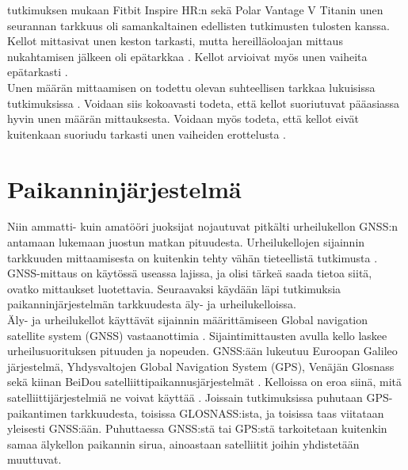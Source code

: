 \documentclass[utf8,bachelor,finnish]{bachelor}
\begin{document}
  \textcite{chinoy_performance_2022} tutkimuksen mukaan Fitbit Inspire HR:n sekä Polar Vantage V Titanin unen seurannan tarkkuus oli 
    samankaltainen edellisten tutkimusten tulosten kanssa. Kellot mittasivat unen keston tarkasti,
     mutta hereilläoloajan mittaus nukahtamisen jälkeen oli epätarkkaa \parencite{chinoy_performance_2022}.
      Kellot arvioivat myös unen vaiheita epätarkasti \parencite{chinoy_performance_2022}.\\
  
  Unen määrän mittaamisen on todettu olevan suhteellisen tarkkaa lukuisissa tutkimuksissa
   \parencite{de_zambotti_measures_2016,liang2018validity,chinoy_performance_2022,miller_validation_2022}. Voidaan siis kokoavasti todeta, että kellot suoriutuvat
    pääasiassa hyvin unen määrän mittauksesta. Voidaan myös todeta, että kellot eivät kuitenkaan suoriudu tarkasti unen vaiheiden erottelusta
     \parencite{chinoy_performance_2022,de_zambotti_measures_2016,liang2018validity}.
       
         
  \section{Paikanninjärjestelmä}
  Niin ammatti- kuin amatööri juoksijat nojautuvat pitkälti urheilukellon GNSS:n antamaan lukemaan juostun matkan pituudesta.
   Urheilukellojen sijainnin tarkkuuden mittaamisesta on kuitenkin tehty vähän tieteellistä tutkimusta \parencite{gilgen-ammann_accuracy_2020}.
    GNSS-mittaus on käytössä useassa lajissa, ja olisi tärkeä saada tietoa siitä, ovatko mittaukset luotettavia. Seuraavaksi käydään läpi tutkimuksia
     paikanninjärjestelmän tarkkuudesta äly- ja urheilukelloissa.\\

  Äly- ja urheilukellot käyttävät sijainnin määrittämiseen Global navigation satellite system (GNSS) vastaanottimia \parencite{gilgen-ammann_accuracy_2020}. 
  Sijaintimittausten avulla kello laskee urheilusuorituksen pituuden ja nopeuden. GNSS:ään lukeutuu Euroopan Galileo järjestelmä, Yhdysvaltojen Global Navigation System (GPS),
   Venäjän Glosnass sekä kiinan BeiDou satelliittipaikannusjärjestelmät \parencite{hofmann2007gnss}.
    Kelloissa on eroa siinä, mitä satelliittijärjestelmiä ne voivat käyttää \parencite{ammann_accuracy_2016}.
     Joissain tutkimuksissa puhutaan GPS-paikantimen tarkkuudesta, toisissa GLOSNASS:ista, ja toisissa taas viitataan yleisesti GNSS:ään. Puhuttaessa GNSS:stä tai GPS:stä
      tarkoitetaan kuitenkin samaa älykellon paikannin sirua, ainoastaan satelliitit joihin yhdistetään muuttuvat.\\
\end{document}
